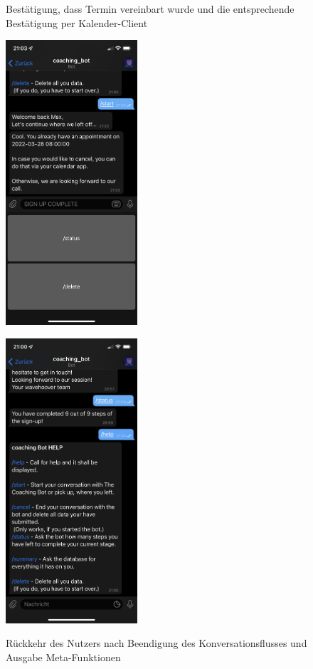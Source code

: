 \begin{figure}
\begin{minipage}{.48\linewidth}
			\caption{Bestätigung, dass Termin vereinbart wurde und die entsprechende Bestätigung per Kalender-Client}
		\end{minipage}\quad
		\begin{minipage}{.48\linewidth}
			\centering
			{\includegraphics[width=\linewidth,height=300pt,keepaspectratio]{images/Screenshots/return-with-appointment.PNG}}
		
			{\includegraphics[width=\linewidth,height=300pt,keepaspectratio]{images/Screenshots/status-and-help.PNG}}
		
			\caption{Rückkehr des Nutzers nach Beendigung des Konversationsflusses und Ausgabe Meta-Funktionen}
		\end{minipage}
	\end{figure}



